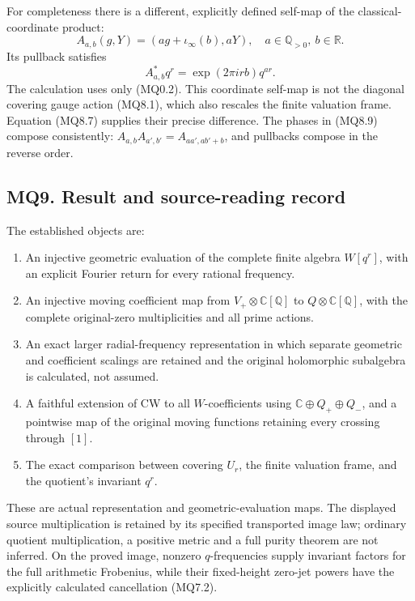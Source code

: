 For completeness there is a different, explicitly defined self-map of
the classical-coordinate product: \[
A_{a,b}(g,Y)=(ag+\iota_\infty(b),aY),
\quad a\in\mathbb Q_{>0},\ b\in\mathbb R.
\] Its pullback satisfies \[
A_{a,b}^*q^r=\exp(2\pi irb)q^{ar}.
\tag{MQ8.9}
\] The calculation uses only (MQ0.2). This coordinate self-map is not
the diagonal covering gauge action (MQ8.1), which also rescales the
finite valuation frame. Equation (MQ8.7) supplies their precise
difference. The phases in (MQ8.9) compose consistently:
\(A_{a,b}A_{a',b'}=A_{aa',ab'+b}\), and pullbacks compose in the reverse
order.

\subsection{MQ9. Result and source-reading
record}\label{mq9.-result-and-source-reading-record}

The established objects are:

\begin{enumerate}
\def\labelenumi{\arabic{enumi}.}
\tightlist
\item
  An injective geometric evaluation of the complete finite algebra
  \(W[q^r]\), with an explicit Fourier return for every rational
  frequency.
\item
  An injective moving coefficient map from
  \(V_+\otimes\mathbb C[\mathbb Q]\) to
  \(Q\otimes\mathbb C[\mathbb Q]\), with the complete original-zero
  multiplicities and all prime actions.
\item
  An exact larger radial-frequency representation in which separate
  geometric and coefficient scalings are retained and the original
  holomorphic subalgebra is calculated, not assumed.
\item
  A faithful extension of CW to all \(W\)-coefficients using
  \(\mathbb C\oplus Q_+\oplus Q_-\), and a pointwise map of the original
  moving functions retaining every crossing through \([1]\).
\item
  The exact comparison between covering \(U_r\), the finite valuation
  frame, and the quotient's invariant \(q^r\).
\end{enumerate}

These are actual representation and geometric-evaluation maps. The
displayed source multiplication is retained by its specified transported
image law; ordinary quotient multiplication, a positive metric and a
full purity theorem are not inferred. On the proved image, nonzero
\(q\)-frequencies supply invariant factors for the full arithmetic
Frobenius, while their fixed-height zero-jet powers have the explicitly
calculated cancellation (MQ7.2).

